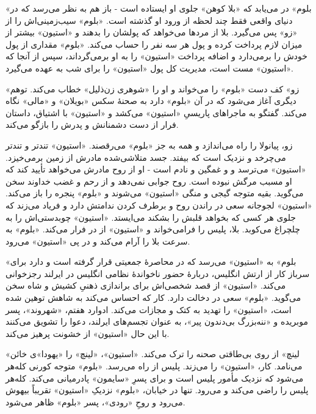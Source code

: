 \documentclass[12pt]{book}
\newcommand{\noun}[1]{«{#1}»}
\begin{document}
    \noun{بلوم} در می‌یابد که \noun{بلا کوهن} جلوی او ایستاده است - باز هم به نظر می‌رسد که در دنیای واقعی فقط چند لحظه از ورود او گذشته است. \noun{بلوم} سیب‌زمینی‌اش را از \noun{زو} پس می‌گیرد. بلا از مردها می‌خواهد که پولشان را بدهند و \noun{استیون} بیشتر از میزان لازم پرداخت کرده و پول هر سه نفر را حساب می‌کند. \noun{بلوم} مقداری از پول خودش را برمی‌دارد و اضافه پرداخت \noun{استیون} را به او برمی‌گرداند، سپس از آنجا که \noun{استیون} مست است، مدیریت کل پول \noun{استیون} را برای شب به عهده می‌گیرد.

    \noun{زو} کف دست \noun{بلوم} را می‌خواند و او را «شوهری زن‌ذلیل» خطاب می‌کند. توهم دیگری آغاز می‌شود که در آن \noun{بلوم} دارد به صحنۀ سکس \noun{بویلان} و \noun{مالی} نگاه می‌کند. گفتگو به ماجراهای پاریسیِ \noun{استیون} می‌کشد و \noun{استیون} با اشتیاق، داستان فرار از دست دشمنانش و پدرش را بازگو می‌کند.

    زو، پیانولا را راه می‌اندازد و همه به جز \noun{بلوم} می‌رقصند. \noun{استیون} تندتر و تندتر می‌چرخد و نزدیک است که بیفتد. جسد متلاشی‌شده مادرش از زمین برمی‌خیزد. \noun{استیون} می‌ترسد و و غمگین و نادم است - او از روح مادرش می‌خواهد تأیید کند که او مسبب مرگش نبوده است. روح جوابی نمی‌دهد و از رحم و غضب خداوند سخن می‌گوید. بقیه متوجه گیجی و منگی \noun{استیون} می‌شوند و \noun{بلوم} پنجره را باز می‌کند. \noun{استیون} لجوجانه سعی در راندن روح و برطرف کردن ندامتش دارد و فریاد می‌زند که جلوی هر کسی که بخواهد قلبش را بشکند می‌ایستد. \noun{استیون} چوبدستی‌اش را به چلچراغ می‌کوبد. بلا، پلیس را فرامی‌خواند و \noun{استیون} از در فرار می‌کند. \noun{بلوم} به سرعت بلا را آرام می‌کند و در پی \noun{استیون} می‌رود.

    \noun{بلوم} به \noun{استیون} می‌رسد که در محاصرۀ جمعیتی قرار گرفته است و دارد برای سرباز کار از ارتش انگلیس، دربارۀ حضور ناخواندۀ نظامی انگلیس در ایرلند رجزخوانی می‌کند. \noun{استیون} از قصد شخصی‌اش برای براندازی ذهنیِ کشیش و شاه سخن می‌گوید. \noun{بلوم} سعی در دخالت دارد. کار که احساس می‌کند به شاهش توهین شده است، \noun{استیون} را تهدید به کتک و مجازات می‌کند. ادوارد هفتم، \noun{شهروند‬}، پسر موبریده و «ننه‌بزرگ بی‌دندون پیر»، به عنوان تجسم‌های ایرلند، دعوا را تشویق می‌کنند با این حال \noun{استیون} از خشونت پرهیز می‌کند.

    \noun{لینچ} از روی بی‌طاقتی صحنه را ترک می‌کند. \noun{استیون}، \noun{لینچ} را «یهودا»ی خائن می‌نامد. کار، \noun{استیون} را می‌زند. پلیس از راه می‌رسد. \noun{بلوم} متوجه کورنی کله‌هر می‌شود که نزدیک مأمور پلیس است و برای پسرِ \noun{سایمون}  پادرمیانی می‌کند. کله‌هر پلیس را راضی می‌کند و می‌رود. تنها در خیابان، \noun{بلوم} نزدیکِ \noun{استیون} تقریباً بیهوش می‌رود و روحِ \noun{رودی}، پسر \noun{بلوم} ظاهر می‌شود.
\end{document}
